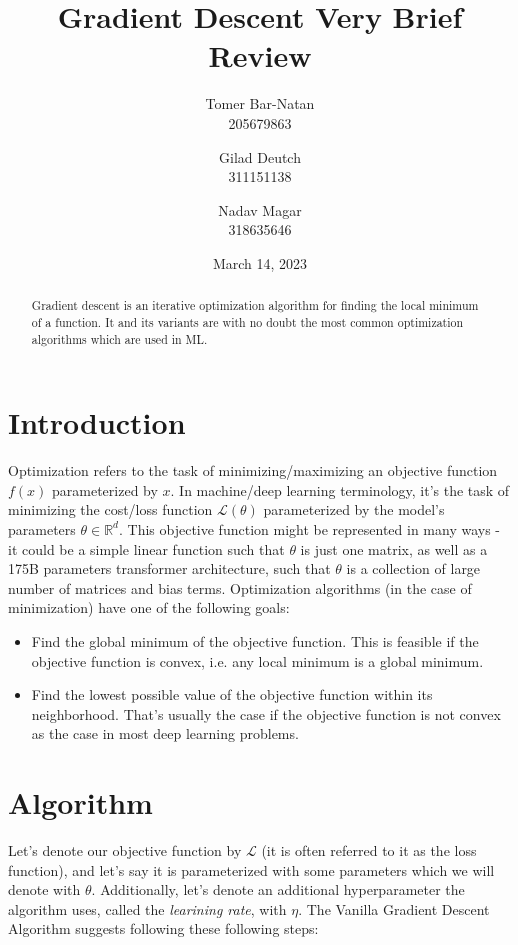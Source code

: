 \documentclass{article}
\title{Gradient Descent Very Brief Review}
\author{Tomer Bar-Natan \\205679863 \and Gilad Deutch \\311151138 \and Nadav Magar \\ 318635646}
\date{March 14, 2023}
\begin{document}
\maketitle

\begin{abstract}
	Gradient descent is an iterative optimization algorithm for finding the local minimum of a function.
	It and its variants are with no doubt the most common optimization algorithms which are used in
	ML.
\end{abstract}

\section{Introduction}
Optimization refers to the task of minimizing/maximizing
an objective function $f(x)$ parameterized
by $x$. In machine/deep learning terminology, it's the task of minimizing the cost/loss function
$\mathcal{L}(\theta)$ parameterized by the model's parameters $\theta \in \mathbb{R}^{d}$.
This objective function might be represented in
many ways - it could be a simple linear function such that $\theta$ is just one matrix, as well as a 175B
parameters transformer architecture, such that $\theta$ is a collection of large number of matrices and bias
terms. Optimization algorithms (in the case of minimization) have one of the following goals:

\begin{itemize}
	\item Find the global minimum of the objective function. This is feasible if the objective function is
	      convex, i.e. any local minimum is a global minimum.
	\item Find the lowest possible value of the objective function within its neighborhood. That's usually the
	      case if the objective function is not convex as the case in most deep learning problems.

\end{itemize}

\section{Algorithm}
Let's denote our objective function by $\mathcal{L}$ (it is often referred to it as the loss function), and let's say
it is parameterized with some parameters which we will denote with $\theta$.
Additionally, let's denote an
additional hyperparameter the algorithm uses, called the \emph{learining rate},
with $\eta$.  The Vanilla Gradient
Descent Algorithm suggests following these following steps:
\end{document}
